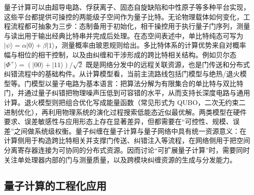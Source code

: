 量子计算可以由超导电路、俘获离子、固态自旋缺陷和中性原子等多种平台实现，这些平台都提供可操控的两能级子空间作为量子比特\cite{NationalAcademies2019QC,Awschalom2021QuIC,Covey2023QuantumNetworksNeutralAtomNodes}。无论物理载体如何变化，工程流程都可抽象为三步：态制备用于初始化，相干操控用于执行量子门序列，测量与读出用于输出经典比特串并完成后处理\cite{NielsenChuang2010QCQI,NationalAcademies2019QC}。在态空间表述中，单比特纯态可写为 $|\psi\rangle=\alpha|0\rangle+\beta|1\rangle$，测量概率由玻恩规则给出。多比特体系的计算优势来自对概率幅与相位的相干控制，以及由纠缠和干涉形成的跨比特相关结构\cite{NielsenChuang2010QCQI,Preskill2018NISQ}。例如贝尔态 $|\Phi^{+}\rangle=(|00\rangle+|11\rangle)/\sqrt{2}$ 既是网络分发中的远程关联资源，也是门传送和分布式纠错流程中的基础构件\cite{NielsenChuang2010QCQI,Monroe2014ModularQC,Wehner2018QuantumInternetVision}。从计算模型看，当前主流路线包括门模型与绝热/退火模型等\cite{NielsenChuang2010QCQI,Preskill2018NISQ}。门模型以量子电路为基本语言：把算法分解为有限集合的单比特与双比特门，并通过量子纠错把物理噪声压低到可容错的水平，从而支持长深度电路与通用计算\cite{NationalAcademies2019QC}。退火模型则把组合优化写成能量函数（常见形式为 QUBO，二次无约束二进制优化），再利用物理系统的演化过程搜索低能态近似最优解\cite{Wang2016WirelessAnnealing,Phillipson2023QuantumTelecommunicationSurvey}。两类模型在硬件要求、误差敏感性与应用形态上存在显著差异，但都需要在“可控性、规模、误差”之间做系统级权衡\cite{Preskill2018NISQ,NationalAcademies2019QC}。量子纠缠在量子计算与量子网络中具有统一资源意义：在计算侧用于构造跨比特相关并支撑门传送、纠错注入等流程，在网络侧用于把空间分离寄存器连接为可协同的分布式资源\cite{NielsenChuang2010QCQI,Monroe2014ModularQC,Wehner2018QuantumInternetVision}。因而讨论“可扩展量子计算”时，需要同时关注单处理器内部的门与测量质量，以及跨模块纠缠资源的生成与分发能力\cite{Jiang2007DistributedQC,Wehner2018QuantumInternetVision}。

\subsection{量子计算的工程化应用}

